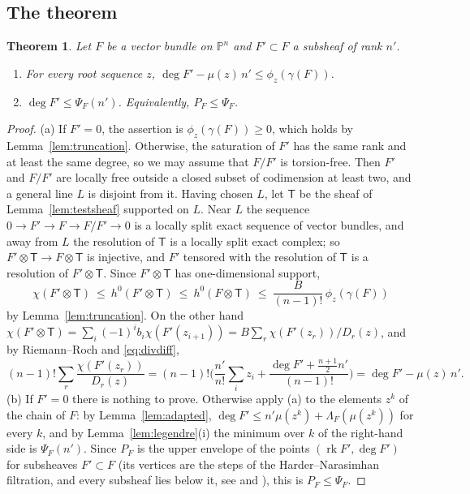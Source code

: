 \documentclass[11pt]{amsart}
\newtheorem{theorem}{Theorem}[section]
\theoremstyle{definition}
\theoremstyle{remark}
\newcommand{\PP}{\mathbb{P}}
\newcommand{\Tt}{\mathsf{T}}
\DeclareMathOperator{\rk}{rk}
\begin{document}
\subsection{The theorem}
\begin{theorem}\label{thm:main}
Let $F$ be a vector bundle on $\PP^n$ and $F'\subset F$ a subsheaf of rank $n'$.
\begin{enumerate}[label=\textup{(\alph*)}]
\item For every root sequence $z$, $\deg F'-\mu(z)\,n'\le\phi_z(\gamma(F))$.
\item $\deg F'\le\Psi_F(n')$. Equivalently, $P_F\le\Psi_F$.
\end{enumerate}
\end{theorem}

\begin{proof}
(a) If $F'=0$, the assertion is $\phi_z(\gamma(F))\ge0$, which holds by Lemma~\ref{lem:truncation}. Otherwise, the saturation of $F'$ has the same rank and at least the same degree, so we may assume that $F/F'$ is torsion-free. Then $F'$ and $F/F'$ are locally free outside a closed subset of codimension at least two, and a general line $L$ is disjoint from it. Having chosen $L$, let $\Tt$ be the sheaf of Lemma~\ref{lem:testsheaf} supported on $L$. Near $L$ the sequence $0\to F'\to F\to F/F'\to0$ is a locally split exact sequence of vector bundles, and away from $L$ the resolution of $\Tt$ is a locally split exact complex; so $F'\otimes \Tt\to F\otimes \Tt$ is injective, and $F'$ tensored with the resolution of $\Tt$ is a resolution of $F'\otimes \Tt$. Since $F'\otimes \Tt$ has one-dimensional support,
\[
\chi(F'\otimes \Tt)\ \le\ h^0(F'\otimes \Tt)\ \le\ h^0(F\otimes \Tt)\ \le\ \frac B{(n-1)!}\,\phi_z(\gamma(F))
\]
by Lemma~\ref{lem:truncation}. On the other hand $\chi(F'\otimes \Tt)=\sum_i(-1)^ib_i\chi(F'(z_{i+1}))=B\sum_r\chi(F'(z_r))/D_r(z)$, and by Riemann--Roch and \eqref{eq:divdiff},
\[
(n-1)!\sum_r\frac{\chi(F'(z_r))}{D_r(z)}=(n-1)!\Big(\frac{n'}{n!}\sum_iz_i+\frac{\deg F'+\frac{n+1}2n'}{(n-1)!}\Big)=\deg F'-\mu(z)\,n'.
\]
(b) If $F'=0$ there is nothing to prove. Otherwise apply (a) to the elements $z^k$ of the chain of $F$: by Lemma~\ref{lem:adapted}, $\deg F'\le n'\mu(z^k)+\Lambda_F(\mu(z^k))$ for every $k$, and by Lemma~\ref{lem:legendre}(i) the minimum over $k$ of the right-hand side is $\Psi_F(n')$. Since $P_F$ is the upper envelope of the points $(\rk F',\deg F')$ for subsheaves $F'\subset F$ (its vertices are the steps of the Harder--Narasimhan filtration, and every subsheaf lies below it, see \cite[\S1.3]{HL10} and \cite{Sh77}), this is $P_F\le\Psi_F$.
\end{proof}
\end{document}
